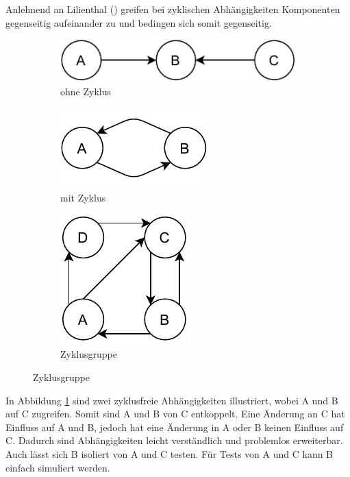 Anlehnend an Lilienthal (\citeyear[vgl.][88 - 90]{Lilienthal2019}) greifen bei zyklischen Abhängigkeiten Komponenten gegenseitig aufeinander zu und bedingen sich somit gegenseitig. 

\begin{figure}[H]
    \centering
    \caption{Beispiele für Abhängigkeiten basierend auf Lilienthal}
    \label{fig:exampleCircular}
    \begin{subfigure}[b]{.3\textwidth}
        \centering
        \includegraphics[width=.9\textwidth]{diagrams/Methoden/Circular-Example-C.pdf}
        \caption{ohne Zyklus}
        \label{fig:circularA}
    \end{subfigure}
    \begin{subfigure}[b]{.3\textwidth}
        \centering
        \includegraphics[width=.6\textwidth]{diagrams/Methoden/Circular-Example-A.pdf}
        \caption{mit Zyklus}
        \label{fig:circularB}
    \end{subfigure}
    \begin{subfigure}[b]{.3\textwidth}
        \centering
        \includegraphics[width=.5\textwidth]{diagrams/Methoden/Circular-Example-B.pdf}
        \caption{Zyklusgruppe}
        \label{fig:circularC}
    \end{subfigure}
\end{figure}
In Abbildung \ref{fig:circularA} sind zwei zyklusfreie Abhängigkeiten illustriert, wobei A und B auf C zugreifen. Somit sind A und B von C entkoppelt. Eine Änderung an C hat Einfluss auf A und B, jedoch hat eine Änderung in A oder B keinen Einfluss auf C. Dadurch sind Abhängigkeiten leicht verständlich und problemlos erweiterbar. 
Auch lässt sich B isoliert von A und C testen. Für Tests von A und C kann B einfach simuliert werden.

